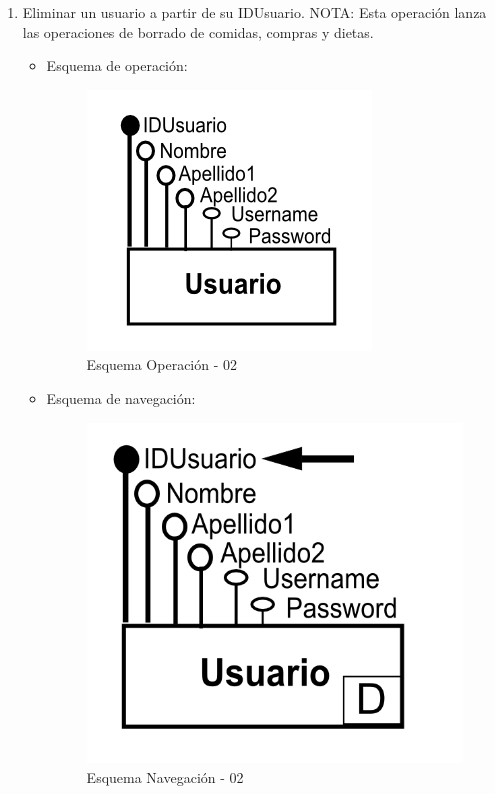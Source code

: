 \documentclass[a4paper,12pt]{report}
\begin{document}
\begin{enumerate}
\item Eliminar un usuario a partir de su IDUsuario.
NOTA: Esta operación lanza las operaciones de borrado de comidas, compras y dietas.
\begin{itemize}
\item Esquema de operación:
\begin{figure}[!htp]
\centering
\includegraphics[width=0.4\linewidth]{./operaciones/img/Usuarios/02_ope.png}
\caption{Esquema Operación - 02}
\label{fig:ope02}
\medskip
\footnotesize
{}
\end{figure}
\item Esquema de navegación:
\begin{figure}[!htp]
\centering
\includegraphics[width=0.4\linewidth]{./operaciones/img/Usuarios/02_nav.png}
\caption{Esquema Navegación - 02}
\label{fig:nave02}
\medskip
\footnotesize
{}
\end{figure}
\end{itemize}


\end{enumerate}
\end{document}
